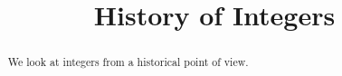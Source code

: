 \documentclass{ximera}
\title{History of Integers}
\begin{document}
\begin{abstract}
We look at integers from a historical point of view.
\end{abstract}
\end{document}
